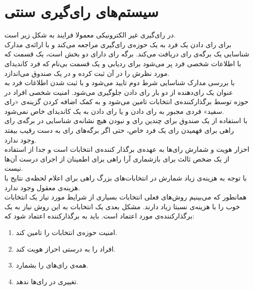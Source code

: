 \section{سیستم‌های رای‌گیری سنتی}
\par
در رای‌گیری غیر الکترونیکی معمولا فرایند به شکل زیر است. 
\\
برای رای دادن یک فرد به یک حوزه‌ی رای‌گیری مراجعه می‌کند و با ارائه‌ی مدارک شناسایی یک برگه‌ی رای دریافت می‌کند. برگه رای دارای دو بخش است، یک قسمت که با اطلاعات شخصی فرد پر می‌شود برای رد‌یابی و یک قسمت بی‌نام که فرد کاندیدای مورد نظرش را در آن ثبت کرده و در یک صندوق می‌اندازد. 
\\
با بررسی مدارک شناسایی شرط دوم تایید می‌شود و با ثبت شدن اطلاغات فرد به عنوان یک رای‌دهنده از دو بار رای دادن جلوگیری می‌شود. امنیت شخصی افراد در حوزه توسط برگذارکننده‌ی انتخابات تامین می‌شود و به کمک اضافه کردن گزینه‌ی «رای سفید» فردی مجبور به رای دادن و یا رای دادن به یک کاندیدای خاص نمی‌شود. 
\\
با استفاده از یک صندوق برای چندین رای و نبودن هیچ نشانه‌ی شناسایی در برگه‌ی رای راهی برای فهمیدن رای یک فرد خاص، حتی اگر برگه‌های رای به دست رقیب بیفتد وجود ندارد. 
\\
احزار هویت و شمارش رای‌ها به عهده‌ی برگذار کننده‌ی انتخابات است و جدا از استفاده از یک ضخص ثالث برای بازشماری آرا راهی برای اطمینان از اجرای درست آن‌ها نیست. 
\\
با توجه به هزینه‌ی زیاد شمارش در انتخابات‌های بزرگ راهی برای اعلام لحظه‌ی نتایج با هزینه‌ی معقول وجود ندارد.
\\
همانطور که می‌بینیم روش‌های فعلی انتخابات بسیاری از شرایط مورد نیاز یک انتخابات خوب را با هزینه‌ی نسبتا زیاد دارند. مشکل بعدی یک انتخابات به این روش نیاز به یک برگذارکننده‌ی مورد اعتماد است. باید به برگذارکننده اعتماد شود که: 
\begin{enumerate}
	\item 
	امنیت حوزه‌ی انتخابات را تامین کند.
	\item 
	افراد را به درستی احراز هویت کند.
	\item 
	همه‌ی رای‌های را بشمارد.
	\item 
	تغییری در رای‌ها ندهد.
	
\end{enumerate}
 

